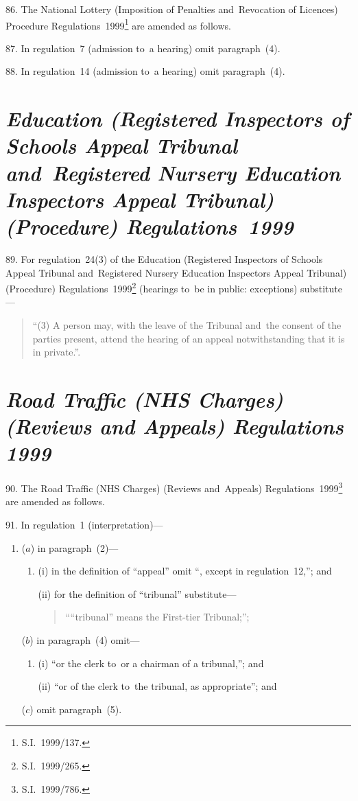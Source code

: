 \documentclass[12pt,a4paper]{article}
\begin{document}
86.  The National Lottery (Imposition of Penalties and~Revocation of Licences) Procedure Regulations~1999\footnote{S.I.~1999/137.} are amended as follows.

\medskip

87.  In regulation~7 (admission to~a hearing) omit paragraph~(4).

\medskip

88.  In regulation~14 (admission to~a hearing) omit paragraph~(4).

\section*{\itshape Education (Registered Inspectors of Schools Appeal Tribunal and~Registered Nursery Education Inspectors Appeal Tribunal) (Procedure) Regulations~1999}

89.  For regulation~24(3) of the Education (Registered Inspectors of Schools Appeal Tribunal and~Registered Nursery Education Inspectors Appeal Tribunal) (Procedure) Regulations~1999\footnote{S.I.~1999/265.} (hearings to~be in public: exceptions) substitute—
\begin{quotation}
“(3) A person may, with the leave of the Tribunal and~the consent of the parties present, attend the hearing of an appeal notwithstanding that it is in private.”.
\end{quotation}

\section*{\itshape Road Traffic (NHS Charges) (Reviews and Appeals) Regulations 1999}

90.  The Road Traffic (NHS Charges) (Reviews and~Appeals) Regulations~1999\footnote{S.I.~1999/786.} are amended as follows.

\medskip

91.  In regulation~1 (interpretation)—
\begin{enumerate}\item[]
($a$) in paragraph~(2)—
\begin{enumerate}\item[]
(i) in the definition of “appeal” omit “, except in regulation~12,”; and

(ii) for the definition of “tribunal” substitute—
\begin{quotation}
““tribunal” means the First-tier Tribunal;”;
\end{quotation}
\end{enumerate}

($b$) in paragraph~(4) omit—
\begin{enumerate}\item[]
(i) “or the clerk to~or a chairman of a tribunal,”; and

(ii) “or of the clerk to~the tribunal, as appropriate”; and
\end{enumerate}

($c$) omit paragraph~(5).
\end{enumerate}
\end{document}
